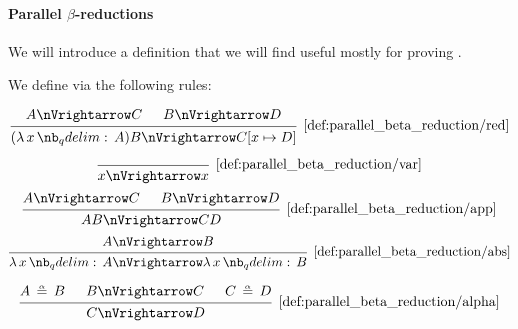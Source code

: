 \paragraph{Parallel \( \beta \)-reductions}

We will introduce a definition that we will find useful mostly for proving .

\begin{definition}\label{def:parallel_beta_reduction}
  We define  via the following rules:

  \begin{equation*}\taglabel[\ensuremath{ \logic{Red}_\Vert }]{def:parallel_beta_reduction/red}
    \begin{prooftree}
      \hypo{ A \pred C }
      \hypo{ B \pred D }
      \infer2[\ref{def:parallel_beta_reduction/red}]{ (\qabs x A)B \pred C[x \mapsto D] }
    \end{prooftree}
  \end{equation*}

  \begin{ThreeColumns}
    \begin{equation*}\taglabel[\ensuremath{ \logic{Var}_\Vert }]{def:parallel_beta_reduction/var}
      \begin{prooftree}
        \infer0[\ref{def:parallel_beta_reduction/var}]{ x \pred x }
      \end{prooftree}
    \end{equation*}
  \BeginSecondColumn
    \begin{equation*}\taglabel[\ensuremath{ \logic{App}_\Vert }]{def:parallel_beta_reduction/app}
      \begin{prooftree}
        \hypo{ A \pred C }
        \hypo{ B \pred D }
        \infer2[\ref{def:parallel_beta_reduction/app}]{ AB \pred CD }
      \end{prooftree}
    \end{equation*}
  \BeginThirdColumn
    \begin{equation*}\taglabel[\ensuremath{ \logic{Abs}_\Vert }]{def:parallel_beta_reduction/abs}
      \begin{prooftree}
        \hypo{ A \pred B }
        \infer1[\ref{def:parallel_beta_reduction/abs}]{ \qabs x A \pred \qabs x B }
      \end{prooftree}
    \end{equation*}
  \end{ThreeColumns}

  \begin{equation*}\taglabel[\ensuremath{ \logic{Alpha}_\Vert }]{def:parallel_beta_reduction/alpha}
    \begin{prooftree}
      \hypo{ A \aequiv B }
      \hypo{ B \pred C }
      \hypo{ C \aequiv D }
      \infer3[\ref{def:parallel_beta_reduction/alpha}]{ C \pred D }
    \end{prooftree}
  \end{equation*}
\end{definition}

